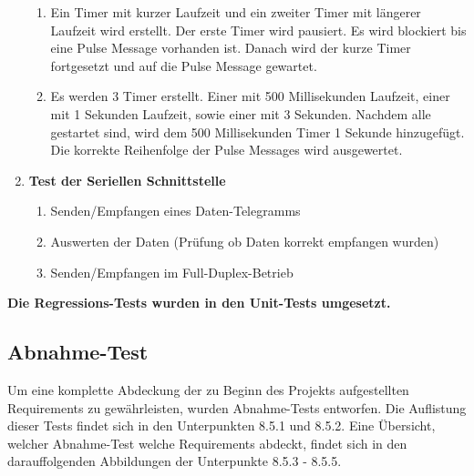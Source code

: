 \documentclass[oneside,a4paper,titlepage]{scrartcl}              %
\begin{document}
\begin{enumerate}
\begin{enumerate}
    \item Ein Timer mit kurzer Laufzeit und ein zweiter Timer mit längerer Laufzeit wird erstellt. Der erste Timer wird pausiert. Es wird blockiert bis eine Pulse Message vorhanden ist. Danach wird der kurze Timer fortgesetzt und auf die Pulse Message gewartet.
    \item Es werden 3 Timer erstellt. Einer mit 500 Millisekunden Laufzeit, einer mit 1 Sekunden Laufzeit, sowie einer mit 3 Sekunden. Nachdem alle gestartet sind, wird dem 500 Millisekunden Timer 1 Sekunde hinzugefügt. Die korrekte Reihenfolge der Pulse Messages wird ausgewertet.
  \end{enumerate}
  \item \textbf{Test der Seriellen Schnittstelle}
  \begin{enumerate}
    \item Senden/Empfangen eines Daten-Telegramms
    \item Auswerten der Daten (Prüfung ob Daten korrekt empfangen wurden)
    \item Senden/Empfangen im Full-Duplex-Betrieb
  \end{enumerate}
\end{enumerate}
\textbf{Die Regressions-Tests wurden in den Unit-Tests umgesetzt.}

\newpage

\subsection{Abnahme-Test}
Um eine komplette Abdeckung der zu Beginn des Projekts aufgestellten Requirements zu gewährleisten, wurden Abnahme-Tests entworfen.\newline
Die Auflistung dieser Tests findet sich in den Unterpunkten 8.5.1 und 8.5.2.\newline
Eine Übersicht, welcher Abnahme-Test welche Requirements abdeckt, findet sich in den darauffolgenden Abbildungen der Unterpunkte 8.5.3 - 8.5.5.

\end{document}
